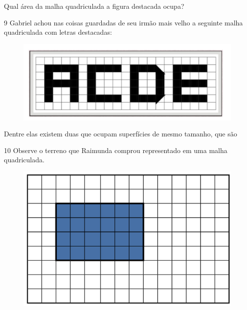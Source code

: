 Qual área da malha quadriculada a figura destacada ocupa?


\num{9} Gabriel achou nas coisas guardadas de seu irmão mais velho a
seguinte malha quadriculada com letras destacadas:

\begin{figure}[htpb!]
\centering
\includegraphics[width=\textwidth]{./imgs/mat7.png}
\end{figure}

Dentre elas existem duas que ocupam superfícies de mesmo tamanho, que são


\pagebreak

\num{10} Observe o terreno que Raimunda comprou representado em uma malha
quadriculada.

\begin{figure}[htpb!]
\centering
\includegraphics[width=\textwidth]{../ilustracoes/MAT5/SAEB_5ANO_MAT_figura45.png}
\end{figure}

